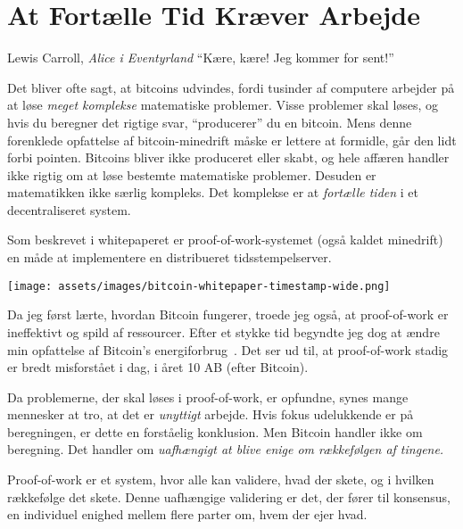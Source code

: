 \chapter{At Fortælle Tid Kræver Arbejde}
\label{les:17}

\begin{chapquote}{Lewis Carroll, \textit{Alice i Eventyrland}}
\enquote{Kære, kære! Jeg kommer for sent!}
\end{chapquote}

Det bliver ofte sagt, at bitcoins udvindes, fordi tusinder af computere arbejder på at løse \textit{meget komplekse} matematiske problemer. Visse problemer skal løses, og hvis du beregner det rigtige svar, \enquote{producerer} du en bitcoin. Mens denne forenklede opfattelse af bitcoin-minedrift måske er lettere at formidle, går den lidt forbi pointen. Bitcoins bliver ikke produceret eller skabt, og hele affæren handler ikke rigtig om at løse bestemte matematiske problemer. Desuden er matematikken ikke særlig kompleks. Det komplekse er at \textit{fortælle tiden} i et decentraliseret system.

Som beskrevet i whitepaperet er proof-of-work-systemet (også kaldet minedrift) en måde at implementere en distribueret tidsstempelserver.

\begin{center}
  \texttt{[image: assets/images/bitcoin-whitepaper-timestamp-wide.png]}
  \label{fig:bitcoin-whitepaper-timestamp-wide}
\end{center}

Da jeg først lærte, hvordan Bitcoin fungerer, troede jeg også, at proof-of-work er ineffektivt og spild af ressourcer. Efter et stykke tid begyndte jeg dog at ændre min opfattelse af Bitcoin's energiforbrug~\cite{gigi:energy}. Det ser ud til, at proof-of-work stadig er bredt misforstået i dag, i året 10 AB (efter Bitcoin).

Da problemerne, der skal løses i proof-of-work, er opfundne, synes mange mennesker at tro, at det er \textit{unyttigt} arbejde. Hvis fokus udelukkende er på beregningen, er dette en forståelig konklusion. Men Bitcoin handler ikke om beregning. Det handler om \textit{uafhængigt at blive enige om rækkefølgen af tingene.}

Proof-of-work er et system, hvor alle kan validere, hvad der skete, og i hvilken rækkefølge det skete. Denne uafhængige validering er det, der fører til konsensus, en individuel enighed mellem flere parter om, hvem der ejer hvad.

